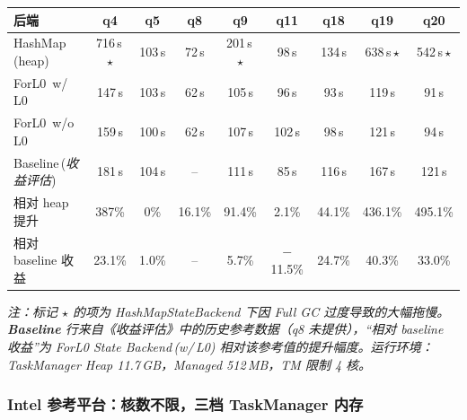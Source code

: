 \documentclass[a4paper,11pt]{article}
\newcommand{\project}{ForL0 State Backend}
\begin{document}
\begin{table}[H]
\centering
\footnotesize
\setlength{\tabcolsep}{4pt}
\begin{tabular}{@{}l cccccccc@{}}
\toprule
\textbf{后端} & \textbf{q4} & \textbf{q5} & \textbf{q8} & \textbf{q9} & \textbf{q11} & \textbf{q18} & \textbf{q19} & \textbf{q20} \\
\midrule
HashMap\,(heap)        & 716\,s\,$\star$ & 103\,s & 72\,s  & 201\,s\,$\star$ & 98\,s  & 134\,s & 638\,s\,$\star$ & 542\,s\,$\star$ \\
ForL0 \,w/\,L0          & 147\,s         & 103\,s & 62\,s  & 105\,s         & 96\,s  & 93\,s  & 119\,s         & 91\,s  \\
ForL0 \,w/o\,L0         & 159\,s         & 100\,s & 62\,s  & 107\,s         & 102\,s & 98\,s  & 121\,s         & 94\,s  \\
Baseline\,(\textit{收益评估})  & 181\,s         & 104\,s & --     & 111\,s         & 85\,s  & 116\,s & 167\,s         & 121\,s \\
\midrule
相对 heap 提升          & 387\% & 0\%    & 16.1\% & 91.4\%  & 2.1\%  & 44.1\% & 436.1\% & 495.1\% \\
相对 baseline 收益      & 23.1\% & 1.0\%  & --     & 5.7\%   & $-$11.5\% & 24.7\% & 40.3\% & 33.0\% \\
\bottomrule
\end{tabular}
\end{table}

\textit{注：标记 $\star$ 的项为 HashMapStateBackend 下因 Full GC 过度导致的大幅拖慢。\textbf{Baseline} 行来自《收益评估》中的历史参考数据（q8 未提供），“相对 baseline 收益”为 \project{}\,(w/\,L0) 相对该参考值的提升幅度。运行环境：TaskManager Heap 11.7\,GB，Managed 512\,MB，TM 限制 4 核。}

\subsubsection{Intel 参考平台：核数不限，三档 TaskManager 内存}
\end{document}
